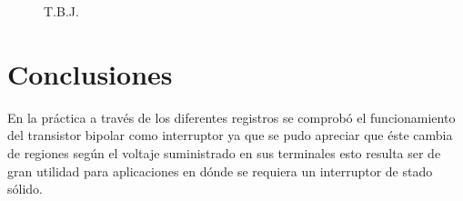 \documentclass{article}
\begin{document}
\begin{figure}[h!]
    \centering
 
    
    \caption{T.B.J.}
    \label{fig:grafTBJ}
\end{figure}



\section{Conclusiones}

En la práctica a través de los diferentes registros se comprobó el funcionamiento del transistor bipolar como interruptor ya que se pudo apreciar que éste cambia de regiones según el voltaje suministrado en sus terminales esto resulta ser de gran utilidad para aplicaciones en dónde se requiera un interruptor de stado sólido.\\









\end{document}
